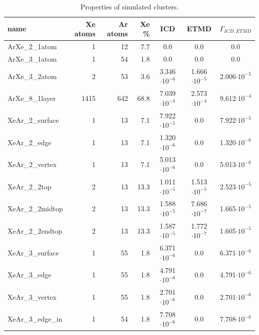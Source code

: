 \begin{table}[h]
\centering
\caption{Properties of simulated clusters.}
\begin{tabular}{lrrrccc}
\toprule
name                 & Xe atoms & Ar atoms & Xe \% &   ICD                &  ETMD                & $\Gamma_{ICD,ETMD}$\\
\midrule
ArXe\_2\_1atom       &      1   &     12   &  7.7  &      0.0             &  0.0                 &     0.0            \\
ArXe\_3\_1atom       &      1   &     54   &  1.8  &      0.0             &  0.0                 &     0.0            \\ 
ArXe\_3\_2atom       &      2   &     53   &  3.6  & 3.346$\cdot 10^{-6}$ & 1.666$\cdot 10^{-5}$ & 2.006$\cdot 10^{-5}$ \\
ArXe\_8\_1layer      &   1415   &    642   & 68.8  & 7.039$\cdot 10^{-4}$ & 2.573$\cdot 10^{-4}$ & 9.612$\cdot 10^{-4}$ \\
\midrule
XeAr\_2\_surface     &      1   &     13   &  7.1  & 7.922$\cdot 10^{-5}$ & 0.0                  & 7.922$\cdot 10^{-5}$ \\
XeAr\_2\_edge        &      1   &     13   &  7.1  & 1.320$\cdot 10^{-6}$ & 0.0                  & 1.320$\cdot 10^{-6}$ \\
XeAr\_2\_vertex      &      1   &     13   &  7.1  & 5.013$\cdot 10^{-6}$ & 0.0                  & 5.013$\cdot 10^{-6}$ \\
XeAr\_2\_2top        &      2   &     13   & 13.3  & 1.011$\cdot 10^{-5}$ & 1.513$\cdot 10^{-5}$ & 2.523$\cdot 10^{-5}$ \\
XeAr\_2\_2midtop     &      2   &     13   & 13.3  & 1.588$\cdot 10^{-5}$ & 7.686$\cdot 10^{-7}$ & 1.665$\cdot 10^{-5}$ \\
XeAr\_2\_2endtop     &      2   &     13   & 13.3  & 1.587$\cdot 10^{-5}$ & 1.772$\cdot 10^{-7}$ & 1.605$\cdot 10^{-5}$ \\
XeAr\_3\_surface     &      1   &     55   &  1.8  & 6.371$\cdot 10^{-6}$ & 0.0                  & 6.371$\cdot 10^{-6}$ \\
XeAr\_3\_edge        &      1   &     55   &  1.8  & 4.791$\cdot 10^{-6}$ & 0.0                  & 4.791$\cdot 10^{-6}$ \\
XeAr\_3\_vertex      &      1   &     55   &  1.8  & 2.701$\cdot 10^{-6}$ & 0.0                  & 2.701$\cdot 10^{-6}$ \\
XeAr\_3\_edge\_in    &      1   &     54   &  1.8  & 7.708$\cdot 10^{-6}$ & 0.0                  & 7.708$\cdot 10^{-6}$ \\

\end{tabular}
\end{table}
